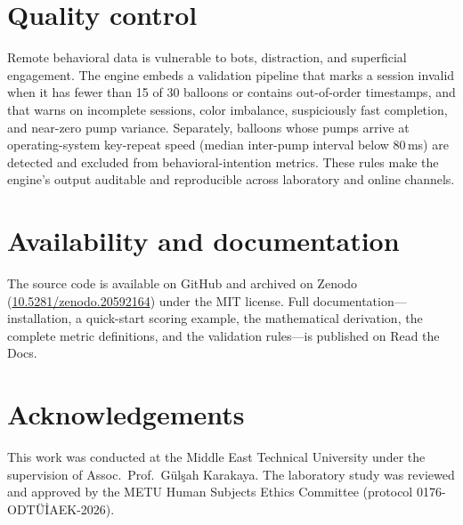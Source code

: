 \documentclass[11pt]{article}
\begin{document}
\section{Quality control}

Remote behavioral data is vulnerable to bots, distraction, and superficial
engagement. The engine embeds a validation pipeline that marks a session invalid
when it has fewer than 15 of 30 balloons or contains out-of-order timestamps, and
that warns on incomplete sessions, color imbalance, suspiciously fast completion,
and near-zero pump variance. Separately, balloons whose pumps arrive at
operating-system key-repeat speed (median inter-pump interval below 80\,ms) are
detected and excluded from behavioral-intention metrics. These rules make the
engine's output auditable and reproducible across laboratory and online channels.

\section{Availability and documentation}

The source code is available on GitHub and archived on Zenodo
(\href{https://doi.org/10.5281/zenodo.20592164}{10.5281/zenodo.20592164}) under the
MIT license. Full documentation---installation, a quick-start scoring example, the
mathematical derivation, the complete metric definitions, and the validation
rules---is published on Read the Docs.

\section*{Acknowledgements}

This work was conducted at the Middle East Technical University under the
supervision of Assoc.\ Prof.\ G\"ul\c{s}ah Karakaya. The laboratory study was
reviewed and approved by the METU Human Subjects Ethics Committee (protocol
0176-ODT\"U\.{I}AEK-2026).



\end{document}
